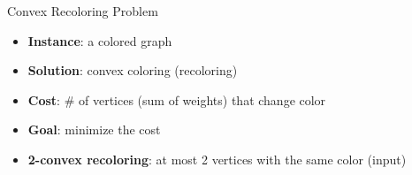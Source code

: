 \begin{frame}{Convex Recoloring Problem}
\begin{itemize}


\item
\textbf{Instance}: a colored graph

\pause\item
\textbf{Solution}: convex coloring (recoloring)

\pause\item
\textbf{Cost}: \# of vertices {\tiny(sum of weights)} that change color

\pause\item
\textbf{Goal}: minimize the cost


\end{itemize}
\pause

\begin{itemize}
\pause\item
{\small\textbf{2-convex recoloring}: at most 2 vertices with the same color (input)} 
\end{itemize}


\end{frame}
